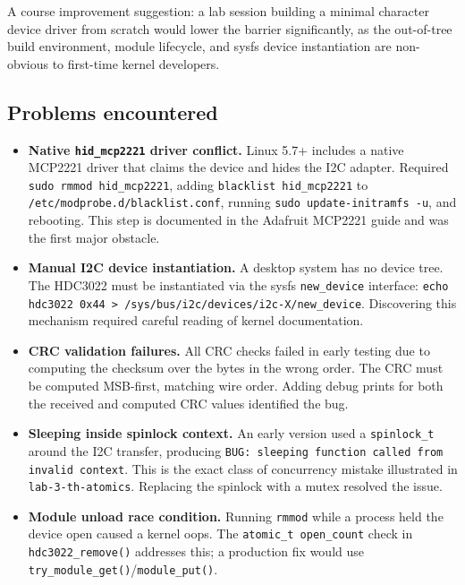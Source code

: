 \documentclass[10pt,a4]{article}
\begin{document}
A course improvement suggestion: a lab session building a minimal character device
driver from scratch would lower the barrier significantly, as the out-of-tree build
environment, module lifecycle, and sysfs device instantiation are non-obvious to
first-time kernel developers.

\subsection{Problems encountered}

\begin{itemize}
  \item \textbf{Native \texttt{hid\_mcp2221} driver conflict.}
  Linux 5.7+ includes a native MCP2221 driver that claims the device and hides the
  I2C adapter. Required \texttt{sudo rmmod hid\_mcp2221}, adding \texttt{blacklist
  hid\_mcp2221} to \texttt{/etc/modprobe.d/blacklist.conf}, running
  \texttt{sudo update-initramfs -u}, and rebooting. This step is documented in the
  Adafruit MCP2221 guide and was the first major obstacle.

  \item \textbf{Manual I2C device instantiation.}
  A desktop system has no device tree. The HDC3022 must be instantiated via the
  sysfs \texttt{new\_device} interface:
  \texttt{echo hdc3022 0x44 > /sys/bus/i2c/devices/i2c-X/new\_device}.
  Discovering this mechanism required careful reading of kernel documentation.

  \item \textbf{CRC validation failures.}
  All CRC checks failed in early testing due to computing the checksum over the
  bytes in the wrong order. The CRC must be computed MSB-first, matching wire
  order. Adding debug prints for both the received and computed CRC values
  identified the bug.

  \item \textbf{Sleeping inside spinlock context.}
  An early version used a \texttt{spinlock\_t} around the I2C transfer, producing
  \texttt{BUG: sleeping function called from invalid context}. This is the exact
  class of concurrency mistake illustrated in \texttt{lab-3-th-atomics}. Replacing
  the spinlock with a mutex resolved the issue.

  \item \textbf{Module unload race condition.}
  Running \texttt{rmmod} while a process held the device open caused a kernel oops.
  The \texttt{atomic\_t open\_count} check in \texttt{hdc3022\_remove()} addresses
  this; a production fix would use \texttt{try\_module\_get()}/\texttt{module\_put()}.
\end{itemize}
\end{document}
